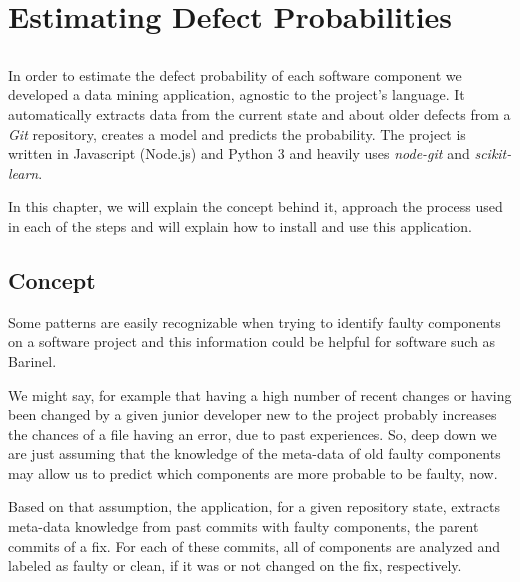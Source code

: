 \chapter{Estimating Defect Probabilities} \label{chap:estimating-dp}

\section*{}

In order to estimate the defect probability of each software component we developed a data mining application, agnostic to the project's language. 
It automatically extracts data from the current state and about older defects from a \emph{Git} repository, creates a model and predicts the probability. The project is written in Javascript (Node.js) and Python 3 and heavily uses \emph{node-git}
and \emph{scikit-learn}.

In this chapter, we will explain the concept behind it, approach the process used in each of the steps and will explain how to install and use this application.

\section{Concept}

Some patterns are easily recognizable when trying to identify faulty components on a software project and this information could be helpful for software such as Barinel. 

We might say, for example that having a high number of recent changes or having been changed by a given junior developer new to the project probably increases the chances of a file having an error, due to past experiences. So, deep down we are just assuming that the knowledge of the meta-data of old faulty components may allow us to predict which components are more probable to be faulty, now.

Based on that assumption, the application, for a given repository state, extracts meta-data knowledge from past commits with faulty components, the parent commits of a fix. For each of these commits, all of components are analyzed and labeled as faulty or clean, if it was or not changed on the fix, respectively.
%
%

